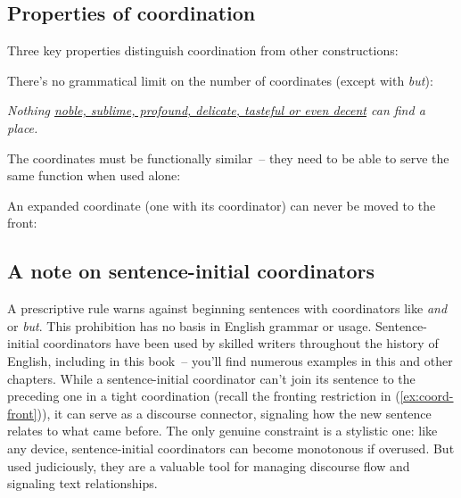 \subsection{Properties of coordination}

Three key properties distinguish coordination from other constructions:

There's no grammatical limit on the number of coordinates (except with \textit{but}):
    
\ea \label{ex:coord-multiple}
    \textit{Nothing \uline{noble, sublime, profound, delicate, tasteful or even decent} can find a place.}
\z

The coordinates must be functionally similar~-- they need to be able to serve the same function when used alone:

\ea \label{ex:coordinate-function}
    \z
\z

An expanded coordinate (one with its coordinator) can never be moved to the front:

\ea \label{ex:coord-front}
    \z
\z

\subsection{A note on sentence-initial coordinators}

A prescriptive rule warns against beginning sentences with coordinators like \textit{and} or \textit{but}. This prohibition has no basis in English grammar or usage. Sentence-initial coordinators have been used by skilled writers throughout the history of English, including in this book~-- you'll find numerous examples in this and other chapters. While a sentence-initial coordinator can't join its sentence to the preceding one in a tight coordination (recall the fronting restriction in (\ref{ex:coord-front})), it can serve as a discourse connector, signaling how the new sentence relates to what came before. The only genuine constraint is a stylistic one: like any device, sentence-initial coordinators can become monotonous if overused. But used judiciously, they are a valuable tool for managing discourse flow and signaling text relationships.


